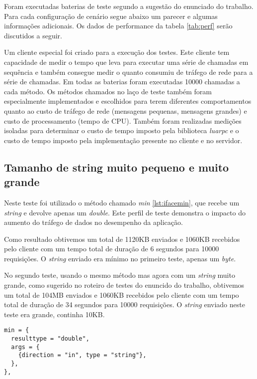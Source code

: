 \documentclass[11pt]{article}
\begin{document}
Foram executadas baterias de teste segundo a sugestão do enunciado do trabalho.
Para cada configuração de cenário segue abaixo um parecer e algumas informações
adicionais. Os dados de performance da tabela \ref{tab:perf} serão discutidos
a seguir.

Um cliente especial foi criado para a execução dos testes. Este cliente tem
capacidade de medir o tempo que leva para executar uma série de chamadas em
sequência e também consegue medir o quanto consumiu de tráfego de rede para a
série de chamadas. Em todas as baterias foram executadas 10000 chamadas a cada
método. Os métodos chamados no laço de teste também foram especialmente
implementados e escolhidos para terem diferentes comportamentos quanto ao custo
de tráfego de rede (mensagens pequenas, mensagens grandes) e custo de
processamento (tempo de CPU). Também foram realizadas medições isoladas para
determinar o custo de tempo imposto pela biblioteca \textit{luarpc} e o custo de
tempo imposto pela implementação presente no cliente e no servidor.

\subsection{Tamanho de string muito pequeno e muito grande}\label{subsec:stringsize}

Neste teste foi utilizado o método chamado \textit{min} \ref{lst:ifacemin}, que
recebe um \textit{string} e devolve apenas um \textit{double}. Este perfil de
teste demonstra o impacto do aumento do tráfego de dados no desempenho da
aplicação.

Como resultado obtivemos um total de 1120KB enviados e 1060KB recebidos pelo
cliente com um tempo total de duração de 6 segundos para 10000 requisições. O
\textit{string} enviado era mínimo no primeiro teste, apenas um \textit{byte}.

No segundo teste, usando o mesmo método mas agora com um \textit{string} muito
grande, como sugerido no roteiro de testes do enuncido do trabalho, obtivemos um
total de 104MB enviados e 1060KB recebidos pelo cliente com um tempo total de
duração de 34 segundos para 10000 requisições. O \textit{string} enviado neste
teste era grande, continha 10KB.

\begin{lstlisting}[caption={Interface min},label={lst:ifacemin}]
min = {
  resulttype = "double",
  args = {
    {direction = "in", type = "string"},
  },
},
\end{lstlisting}
\end{document}
